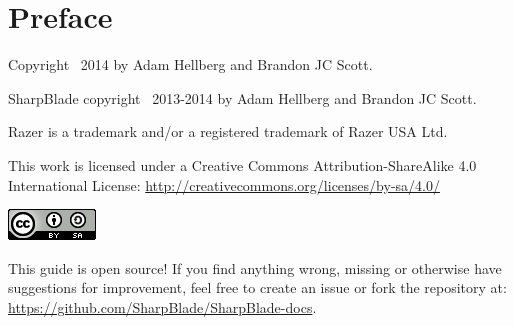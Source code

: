 \chapter{Preface}
Copyright \textcopyright\ 2014 by Adam Hellberg and Brandon JC Scott.

SharpBlade copyright \textcopyright\ 2013-2014 by Adam Hellberg and Brandon JC Scott.

Razer is a trademark and/or a registered trademark of Razer USA Ltd.

This work is licensed under a Creative Commons Attribution\hyp{}ShareAlike 4.0 International License: \url{http://creativecommons.org/licenses/by-sa/4.0/}
\begin{center}
    \includegraphics[scale=0.7]{cc-by-sa.png}
\end{center}

This guide is open source! If you find anything wrong, missing or otherwise have suggestions for improvement, feel free to create an issue or fork the repository at: \url{https://github.com/SharpBlade/SharpBlade-docs}.
